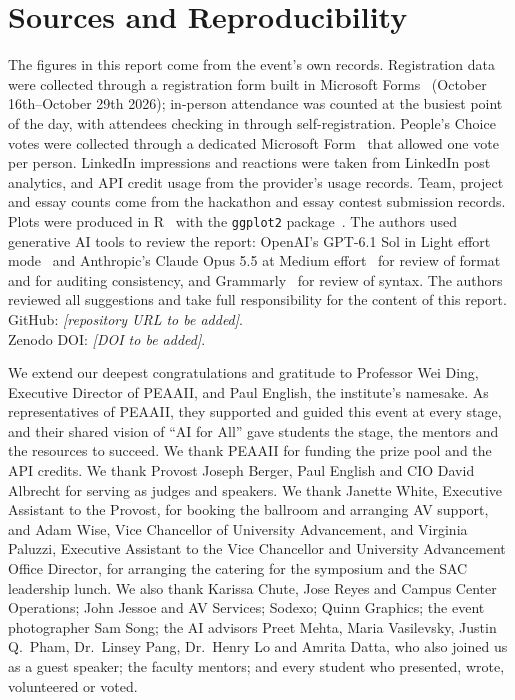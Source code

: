 \documentclass[sigconf,nonacm]{acmart}
\begin{document}
\section{Sources and Reproducibility}
The figures in this report come from the event's own records. Registration data were collected through a registration form built in Microsoft Forms~\cite{msforms} (October 16th--October 29th 2026); in-person attendance was counted at the busiest point of the day, with attendees checking in through self-registration. People's Choice votes were collected through a dedicated Microsoft Form~\cite{msforms} that allowed one vote per person. LinkedIn impressions and reactions were taken from LinkedIn post analytics, and API credit usage from the provider's usage records. Team, project and essay counts come from the hackathon and essay contest submission records. Plots were produced in R~\cite{rcore2026} with the \texttt{ggplot2} package~\cite{wickham2016ggplot2}. The authors used generative AI tools to review the report: OpenAI's GPT-6.1 Sol in Light effort mode~\cite{openai2026gpt61} and Anthropic's Claude Opus 5.5 at Medium effort~\cite{anthropic2026opus55} for review of format and for auditing consistency, and Grammarly~\cite{grammarly2026} for review of syntax. The authors reviewed all suggestions and take full responsibility for the content of this report.
\\
GitHub: \textit{[repository URL to be added]}.\\
Zenodo DOI: \textit{[DOI to be added]}.

\begin{acks}
We extend our deepest congratulations and gratitude to Professor Wei Ding, Executive Director of PEAAII, and Paul English, the institute's namesake. As representatives of PEAAII, they supported and guided this event at every stage, and their shared vision of ``AI for All'' gave students the stage, the mentors and the resources to succeed. We thank PEAAII for funding the prize pool and the API credits. We thank Provost Joseph Berger, Paul English and CIO David Albrecht for serving as judges and speakers. We thank Janette White, Executive Assistant to the Provost, for booking the ballroom and arranging AV support, and Adam Wise, Vice Chancellor of University Advancement, and Virginia Paluzzi, Executive Assistant to the Vice Chancellor and University Advancement Office Director, for arranging the catering for the symposium and the SAC leadership lunch. We also thank Karissa Chute, Jose Reyes and Campus Center Operations; John Jessoe and AV Services; Sodexo; Quinn Graphics; the event photographer Sam Song; the AI advisors Preet Mehta, Maria Vasilevsky, Justin Q.~Pham, Dr.~Linsey Pang, Dr.~Henry Lo and Amrita Datta, who also joined us as a guest speaker; the faculty mentors; and every student who presented, wrote, volunteered or voted.
\end{acks}
\end{document}
